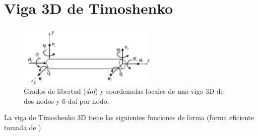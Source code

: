 \section{Viga 3D de Timoshenko}
\begin{figure}[htb!]
	\centering
	\includegraphics[width=0.6\textwidth]{fig/3dbeam.PNG}
	\caption{Grados de libertad (\textit{dof}) y coordenadas locales de una viga 3D de dos nodos y 6 dof por nodo.}
\end{figure}
La viga de Timoshenko 3D tiene las siguientes funciones de forma (forma eficiente tomada de \cite{luo2008efficient})
